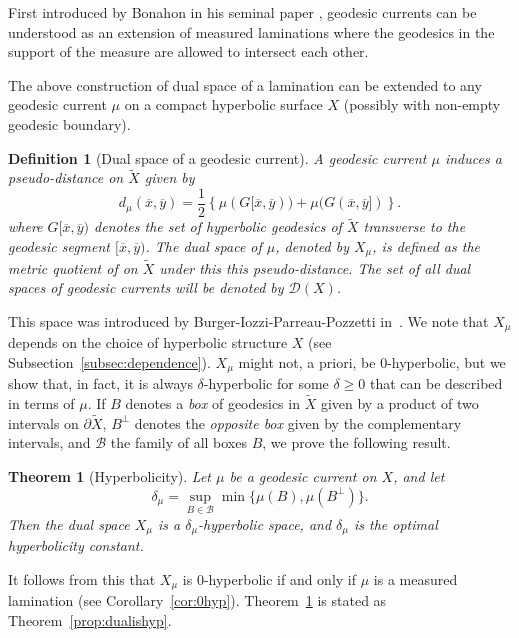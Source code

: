 \documentclass[12pt,article]{amsart}
\numberwithin{equation}{section}
\numberwithin{figure}{section}
\newtheorem{mainthm}{Theorem}
\newtheorem*{maindef}{Definition}
\theoremstyle{definition}
\theoremstyle{plain}
\newcommand*{\wt}[1]{\widetilde{#1}}
\begin{document}
First introduced by Bonahon in his seminal paper \cite{Bonahon86:EndsHyperbolicManifolds}, geodesic currents can be understood as an extension of measured laminations where the geodesics in the support of the measure are allowed to intersect each other. 

The above construction of dual space of a lamination can be extended to any geodesic current $\mu$ on a compact hyperbolic surface $X$ (possibly with non-empty geodesic boundary).

\begin{maindef}[Dual space of a geodesic current]
A geodesic current $\mu$ induces a pseudo-distance on $\wt{X}$ given by
 \[
 d_\mu (\overline{x},\overline{y}) = \frac{1}{2} \left\{ \mu ( G[\overline{x},\overline{y})) + \mu ( G(\overline{x},\overline{y}] )\right\}.
 \]
 where $G[\overline{x},\overline{y})$ denotes the set of hyperbolic geodesics of $\wt{X}$ transverse to the geodesic segment $[\overline{x},\overline{y})$.
 The dual space of $\mu$, denoted by $X_{\mu}$, is defined as the metric quotient of on $\wt{X}$ under this this pseudo-distance. The set of all dual spaces of geodesic currents will be denoted by $\mathcal{D}(X)$.
 \end{maindef}

 This space was introduced by Burger-Iozzi-Parreau-Pozzetti in~\cite{BIPP21:Currents}. We note that $X_{\mu}$ depends on the choice of hyperbolic structure $X$ (see Subsection~\ref{subsec:dependence}).
 $X_{\mu}$ might not, a priori, be $0$-hyperbolic, but we show that, in fact, it is always $\delta$-hyperbolic for some $\delta \geq 0$ that can be described in terms of $\mu$.
If $B$ denotes a \emph{box} of geodesics in $\wt{X}$ given by a product of two intervals on $\partial \wt{X}$, $B^{\perp}$ denotes the \emph{opposite box} given by the complementary intervals, and $\mathcal{B}$ the family of all boxes $B$, we prove the following result.

\begin{mainthm}[Hyperbolicity]\label{thm:hyp_intro}
Let $\mu$ be a geodesic current on $X$, and let 
\[
\delta_\mu = \sup_{B \in \mathcal{B}} \min {\{ \mu(B), \mu(B^ \perp) \}}.
\]
Then the dual space $X_\mu$ is a $\delta_\mu$-hyperbolic space, and $\delta_\mu$ is the optimal hyperbolicity constant.
\end{mainthm}
It follows from this that $X_{\mu}$ is $0$-hyperbolic if and only if $\mu$ is a measured lamination (see Corollary~\ref{cor:0hyp}).
Theorem~\ref{thm:hyp_intro} is stated as Theorem~\ref{prop:dualishyp}.
\end{document}
